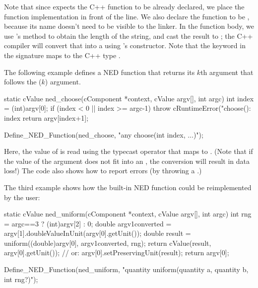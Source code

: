 Note that since  expects the C++ function to
be already declared, we place the function implementation in front of the
 line. We also declare the function to be
, because its name doesn't need to be visible to the linker.
In the function body, we use 's  method to
obtain the length of the string, and cast the result to ; the C++
compiler will convert that into a  using 's
 constructor. Note that the  keyword in the signature
maps to the C++ type .

The following example defines a  NED function that returns
its $k$th argument that follows the  ($k$) argument.

\begin{cpp}
static cValue ned_choose(cComponent *context, cValue argv[], int argc)
{
    int index = (int)argv[0];
    if (index < 0 || index >= argc-1)
        throw cRuntimeError("choose(): index %
    return argv[index+1];
}

Define_NED_Function(ned_choose, "any choose(int index, ...)");
\end{cpp}

Here, the value of  is read using the typecast operator that
maps to . (Note that if the value of the 
argument does not fit into an , the conversion will result
in data loss!) The code also shows how to report errors (by throwing a
.)

The third example shows how the built-in  NED function could
be reimplemented by the user:

\begin{cpp}
static cValue ned_uniform(cComponent *context, cValue argv[], int argc)
{
    int rng = argc==3 ? (int)argv[2] : 0;
    double argv1converted = argv[1].doubleValueInUnit(argv[0].getUnit());
    double result = uniform((double)argv[0], argv1converted, rng);
    return cValue(result, argv[0].getUnit());
    // or: argv[0].setPreservingUnit(result); return argv[0];
}

Define_NED_Function(ned_uniform, "quantity uniform(quantity a, quantity b, int rng?)");
\end{cpp}

